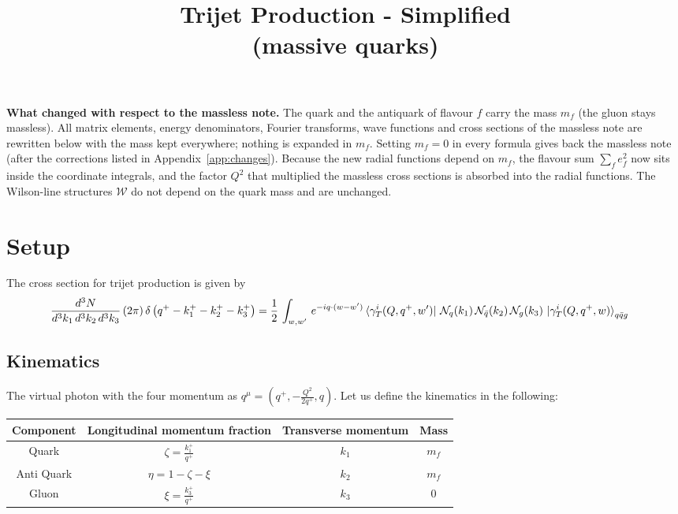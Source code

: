 \documentclass[9pt]{article}
\title{Trijet Production - Simplified \\ \large (massive quarks)}
\author{}
\date{}
\numberwithin{equation}{section}
\begin{document}
\maketitle
\noindent\textbf{What changed with respect to the massless note.} The quark and the antiquark of flavour $f$ carry the mass $m_{f}$ (the gluon stays massless). All matrix elements, energy denominators, Fourier transforms, wave functions and cross sections of the massless note are rewritten below with the mass kept everywhere; nothing is expanded in $m_{f}$. Setting $m_{f}=0$ in every formula gives back the massless note (after the corrections listed in Appendix~\ref{app:changes}). Because the new radial functions depend on $m_{f}$, the flavour sum $\sum_{f}e^{2}_{f}$ now sits inside the coordinate integrals, and the factor $Q^{2}$ that multiplied the massless cross sections is absorbed into the radial functions. The Wilson-line structures $\mathcal{W}$ do not depend on the quark mass and are unchanged.

\section{Setup}
The cross section for trijet production is given by
\begin{align}
    \frac{d^{3}N}{d^{3}k_{1}\,d^{3}k_{2}\, d^{3}k_{3}}\, (2\pi)\,\delta\left(q^{+}-k^{+}_{1}-k^{+}_{2}-k^{+}_{3}\right) & =  \frac{1}{2}\,\int_{w,w'}\, e^{-iq\cdot (w-w')}
\bra{\gamma^{i}_{T}(Q,q^{+},w')}\,\mathcal{N}_{q}(k_{1})\,\mathcal{N}_{\Bar{q}}(k_{2})\,\mathcal{N}_{g}(k_{3})\,\ket{\gamma^{i}_{T}(Q,q^{+},w)}_{q\Bar{q}g}
\end{align}
\subsection{Kinematics}
The virtual photon with the four momentum as $q^{\mu} = \left(q^{+},-\frac{Q^{2}}{2q^{+}},q\right)$. Let us define the kinematics in the following:
\begin{table}[h!]
\centering
\begin{tabular}{||c c c c||}
 \hline
 Component & Longitudinal momentum fraction & Transverse momentum & Mass \\ [0.5ex]
 \hline\hline
 Quark & $\zeta = \frac{k^{+}_{1}}{q^{+}}$  & $k_{1}$ & $m_{f}$ \\
 Anti Quark & $\eta = 1-\zeta-\xi$  &  $k_{2}$ & $m_{f}$ \\
 Gluon & $\xi = \frac{k^{+}_{3}}{q^{+}}$ & $k_{3}$ & $0$ \\
 \hline
\end{tabular}
\label{table:1}
\end{table}
\end{document}
